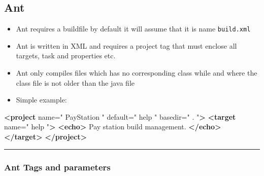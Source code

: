 \documentclass[11pt]{article}
\providecommand{\tightlist}{%
      \setlength{\itemsep}{0pt}\setlength{\parskip}{0pt}}
\newenvironment{Shaded}{}{}
\newcommand{\KeywordTok}[1]{\textcolor[rgb]{0.00,0.44,0.13}{\textbf{{#1}}}}
\newcommand{\StringTok}[1]{\textcolor[rgb]{0.25,0.44,0.63}{{#1}}}
\newcommand{\OtherTok}[1]{\textcolor[rgb]{0.00,0.44,0.13}{{#1}}}
\newcommand{\NormalTok}[1]{{#1}}
\begin{document}
\hypertarget{ant}{%
\subsection{Ant}\label{ant}}

\begin{itemize}
\tightlist
\item
  Ant requires a buildfile by default it will assume that it is name
  \texttt{build.xml}
\item
  Ant is written in XML and requires a project tag that must enclose all
  targets, task and properties etc.
\item
  Ant only compiles files which has no corresponding class while and
  where the class file is not older than the java file
\item
  Simple example:
\end{itemize}

\begin{Shaded}
\begin{Highlighting}[]
\KeywordTok{<project}\OtherTok{ name=}\StringTok{" PayStation "}\OtherTok{ default=}\StringTok{" help "}\OtherTok{ basedir=}\StringTok{" . "}\KeywordTok{>}
    \KeywordTok{<target}\OtherTok{ name=}\StringTok{" help "}\KeywordTok{>} 
        \KeywordTok{<echo>}\NormalTok{ Pay station build management. }\KeywordTok{</echo>}
    \KeywordTok{</target>} 
\KeywordTok{</project>}
\end{Highlighting}
\end{Shaded}

\begin{center}\rule{0.5\linewidth}{\linethickness}\end{center}

\hypertarget{ant-tags-and-parameters}{%
\subsubsection{Ant Tags and parameters}\label{ant-tags-and-parameters}}
\end{document}
